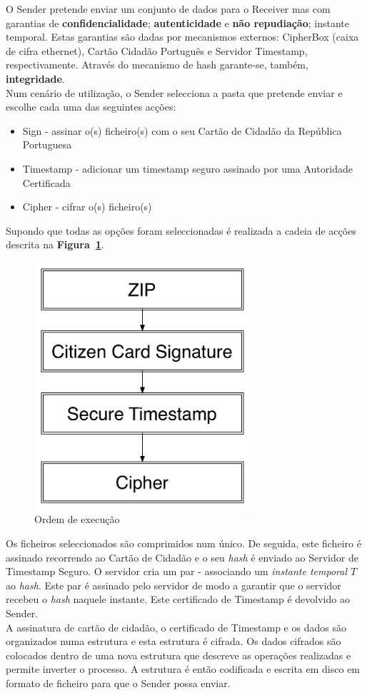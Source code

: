 O Sender pretende enviar um conjunto de dados para o Receiver mas com garantias de \textbf{confidencialidade}; \textbf{autenticidade} e \textbf{não repudiação}; instante temporal. Estas garantias são dadas por mecanismos externos: CipherBox (caixa de cifra ethernet), Cartão Cidadão Português e Servidor Timestamp, respectivamente. Através do mecanismo de hash garante-se, também, \textbf{integridade}. \\

Num cenário de utilização, o Sender selecciona a pasta que pretende enviar e escolhe cada uma das seguintes acções:
\begin{itemize}
\item Sign - assinar o(s) ficheiro(s) com o seu Cartão de Cidadão da República Portuguesa
\item Timestamp - adicionar um timestamp seguro assinado por uma Autoridade Certificada
\item Cipher - cifrar o(s) ficheiro(s)
\end{itemize}

Supondo que todas as opções foram seleccionadas é realizada a cadeia de acções descrita na \textbf{Figura~\ref{fig:order}}. \\

\begin{figure}[htp]
\centering 
\includegraphics[width=8cm]{./Figures/Architecture.pdf}
\caption{Ordem de execução}
\label{fig:order}
\end{figure}

Os ficheiros seleccionados são comprimidos num único. De seguida, este ficheiro é assinado recorrendo ao Cartão de Cidadão e o seu \textit{hash} é enviado ao Servidor de Timestamp Seguro. O servidor cria um par - associando um \textit{instante temporal $T$} ao \textit{hash}. Este par é assinado pelo servidor de modo a garantir que o servidor recebeu o \textit{hash} naquele instante. Este certificado de Timestamp é devolvido ao Sender.\\ 
A assinatura de cartão de cidadão, o certificado de Timestamp e os dados são organizados numa estrutura e esta estrutura é cifrada. Os dados cifrados são colocados dentro de uma nova estrutura que descreve as operações realizadas e permite inverter o processo. A estrutura é então codificada e escrita em disco em formato de ficheiro para que o Sender possa enviar. \\
 
